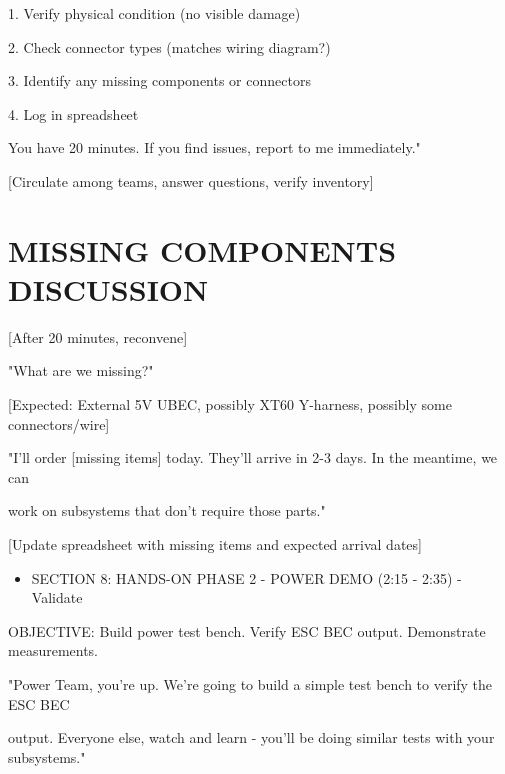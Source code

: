 \documentclass[11pt,letterpaper]{article}
\begin{document}
{1. Verify physical condition (no visible damage)\par

2. Check connector types (matches wiring diagram?)\par

3. Identify any missing components or connectors\par

4. Log in spreadsheet\par

You have 20 minutes. If you find issues, report to me immediately."\par

[Circulate among teams, answer questions, verify inventory]\par

\section{MISSING COMPONENTS DISCUSSION}

[After 20 minutes, reconvene]\par

"What are we missing?"\par

[Expected: External 5V UBEC, possibly XT60 Y-harness, possibly some connectors/wire]\par

"I'll order [missing items] today. They'll arrive in 2-3 days. In the meantime, we can\par

work on subsystems that don't require those parts."\par

[Update spreadsheet with missing items and expected arrival dates]\par

\begin{itemize}
  \item SECTION 8: HANDS-ON PHASE 2 - POWER DEMO (2:15 - 2:35) - Validate
\end{itemize}

OBJECTIVE: Build power test bench. Verify ESC BEC output. Demonstrate measurements.\par

"Power Team, you're up. We're going to build a simple test bench to verify the ESC BEC\par

output. Everyone else, watch and learn - you'll be doing similar tests with your subsystems."\par

}
\end{document}
